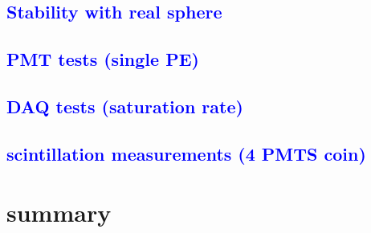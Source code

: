 \documentclass[a4paper,11pt,linenumbers]{article}
\begin{document}
\subsection{\textcolor{blue}{Stability with real sphere}}
\subsection{\textcolor{blue}{PMT tests (single PE)}}
\subsection{\textcolor{blue}{DAQ tests (saturation rate)}}
\subsection{\textcolor{blue}{scintillation measurements (4 PMTS coin)}}



\section{summary}



%
%
%
\end{document}
